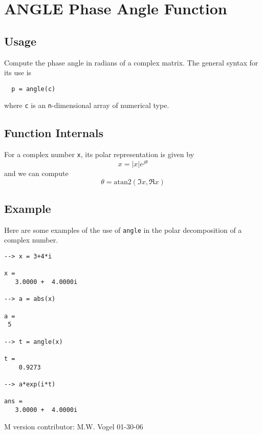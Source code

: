 \section{ANGLE Phase Angle Function}

\subsection{Usage}

Compute the phase angle in radians of a complex matrix.  The general
syntax for its use is
\begin{verbatim}
  p = angle(c)
\end{verbatim}
where \verb|c| is an \verb|n|-dimensional array of numerical type.
\subsection{Function Internals}

For a complex number \verb|x|, its polar representation is
given by
\[
  x = |x| e^{j\theta}
\]
and we can compute 
\[
  \theta = \mathrm{atan2}(\Im x, \Re x)
\]
\subsection{Example}

Here are some examples of the use of \verb|angle| in the polar decomposition
of a complex number.
\begin{verbatim}
--> x = 3+4*i

x = 
   3.0000 +  4.0000i 

--> a = abs(x)

a = 
 5 

--> t = angle(x)

t = 
    0.9273 

--> a*exp(i*t)

ans = 
   3.0000 +  4.0000i 
\end{verbatim}
   M version contributor: M.W. Vogel 01-30-06
